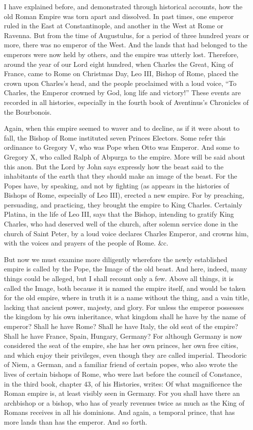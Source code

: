 I have explained before, and demonstrated through historical accounts, how the old Roman Empire was torn apart and dissolved. In past times, one emperor ruled in the East at Constantinople, and another in the West at Rome or Ravenna. But from the time of Augustulus, for a period of three hundred years or more, there was no emperor of the West. And the lands that had belonged to the emperors were now held by others, and the empire was utterly lost. Therefore, around the year of our Lord eight hundred, when Charles the Great, King of France, came to Rome on Christmas Day, Leo III, Bishop of Rome, placed the crown upon Charles’s head, and the people proclaimed with a loud voice, “To Charles, the Emperor crowned by God, long life and victory!” These events are recorded in all histories, especially in the fourth book of Aventinus’s Chronicles of the Bourbonois.

Again, when this empire seemed to waver and to decline, as if it were about to fall, the Bishop of Rome instituted seven Princes Electors. Some refer this ordinance to Gregory V, who was Pope when Otto was Emperor. And some to Gregory X, who called Ralph of Abpurga to the empire. More will be said about this anon. But the Lord by John says expressly how the beast said to the inhabitants of the earth that they should make an image of the beast. For the Popes have, by speaking, and not by fighting (as appears in the histories of Bishops of Rome, especially of Leo III), erected a new empire. For by preaching, persuading, and practicing, they brought the empire to King Charles. Certainly Platina, in the life of Leo III, says that the Bishop, intending to gratify King Charles, who had deserved well of the church, after solemn service done in the church of Saint Peter, by a loud voice declares Charles Emperor, and crowns him, with the voices and prayers of the people of Rome. \&c.

But now we must examine more diligently wherefore the newly established empire is called by the Pope, the Image of the old beast. And here, indeed, many things could be alleged, but I shall recount only a few. Above all things, it is called the Image, both because it is named the empire itself, and would be taken for the old empire, where in truth it is a name without the thing, and a vain title, lacking that ancient power, majesty, and glory. For unless the emperor possesses the kingdom by his own inheritance, what kingdom shall he have by the name of emperor? Shall he have Rome? Shall he have Italy, the old seat of the empire? Shall he have France, Spain, Hungary, Germany? For although Germany is now considered the seat of the empire, she has her own princes, her own free cities, and which enjoy their privileges, even though they are called imperial. Theodoric of Niem, a German, and a familiar friend of certain popes, who also wrote the lives of certain bishops of Rome, who were last before the council of Constance, in the third book, chapter 43, of his Histories, writes: Of what magnificence the Roman empire is, at least visibly seen in Germany. For you shall have there an archbishop or a bishop, who has of yearly revenues twice as much as the King of Romans receives in all his dominions. And again, a temporal prince, that has more lands than has the emperor. And so forth.

